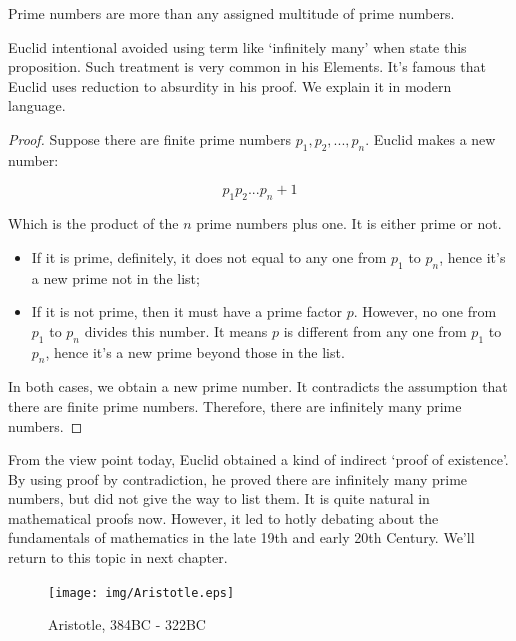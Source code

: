 \documentclass{article}
\begin{document}
\begin{proposition}
Prime numbers are more than any assigned multitude of prime numbers\cite{Elements}.
\end{proposition}

Euclid intentional avoided using term like `infinitely many' when state this proposition. Such treatment is very common in his Elements. It's famous that Euclid uses reduction to absurdity in his proof. We explain it in modern language.

\begin{proof}
Suppose there are finite prime numbers $p_1, p_2, ..., p_n$. Euclid makes a new number:

\[
p_1 p_2 ... p_n + 1
\]

Which is the product of the $n$ prime numbers plus one. It is either prime or not.

\begin{itemize}
\item If it is prime, definitely, it does not equal to any one from $p_1$ to $p_n$, hence it's a new prime not in the list;
\item If it is not prime, then it must have a prime factor $p$. However, no one from $p_1$ to $p_n$ divides this number. It means $p$ is different from any one from $p_1$ to $p_n$, hence it's a new prime beyond those in the list.
\end{itemize}

In both cases, we obtain a new prime number. It contradicts the assumption that there are finite prime numbers. Therefore, there are infinitely many prime numbers.
\end{proof}

From the view point today, Euclid obtained a kind of indirect `proof of existence'. By using proof by contradiction, he proved there are infinitely many prime numbers, but did not give the way to list them. It is quite natural in mathematical proofs now. However, it led to hotly debating about the fundamentals of mathematics in the late 19th and early 20th Century. We'll return to this topic in next chapter.

\begin{figure}[htbp]
 \centering
 \texttt{[image: img/Aristotle.eps]}
 \captionsetup{labelformat=empty}
 \caption{Aristotle, 384BC - 322BC}
 \label{fig:Aristotle}
\end{figure}
\end{document}
